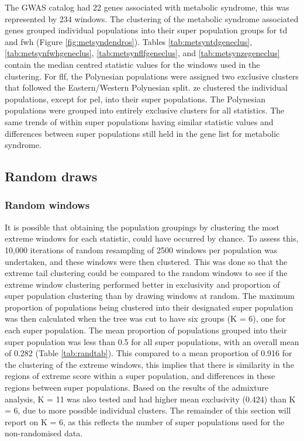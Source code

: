 \documentclass[]{report}
\begin{document}
The GWAS catalog had 22 genes associated with metabolic syndrome, this
was represented by 234 windows. The clustering of the metabolic syndrome
associated genes grouped individual populations into their super
population groups for \gls{td} and \gls{fwh} (Figure
\ref{fig:metsyndendros}). Tables \ref{tab:metsyntdgeneclus},
\ref{tab:metsynfwhgeneclus}, \ref{tab:metsynflfgeneclus}, and
\ref{tab:metsynzegeneclus} contain the median centred statistic values
for the windows used in the clustering. For \gls{flf}, the Polynesian
populations were assigned two exclusive clusters that followed the
Eastern/Western Polynesian split. \Gls{ze} clustered the individual
populations, except for \gls{pel}, into their super populations. The
Polynesian populations were grouped into entirely exclusive clusters for
all statistics. The same trends of within super populations having
similar statistic values and differences between super populations still
held in the gene list for metabolic syndrome.

\subsection{Random draws}\label{random-draws}

\subsubsection{Random windows}\label{random-windows}

It is possible that obtaining the population groupings by clustering the
most extreme windows for each statistic, could have occurred by chance.
To assess this, 10,000 iterations of random resampling of 2500 windows
per population was undertaken, and these windows were then clustered.
This was done so that the extreme tail clustering could be compared to
the random windows to see if the extreme window clustering performed
better in exclusivity and proportion of super population clustering than
by drawing windows at random. The maximum proportion of populations
being clustered into their designated super population was then
calculated when the tree was cut to have six groups (K = 6), one for
each super population. The mean proportion of populations grouped into
their super population was less than 0.5 for all super populations, with
an overall mean of 0.282 (Table \ref{tab:randtab}). This compared to a
mean proportion of 0.916 for the clustering of the extreme windows, this
implies that there is similarity in the regions of extreme score within
a super population, and differences in these regions between super
populations. Based on the results of the admixture analysis, K = 11 was
also tested and had higher mean exclusivity (0.424) than K = 6, due to
more possible individual clusters. The remainder of this section will
report on K = 6, as this reflects the number of super populations used
for the non-randomised data.
\end{document}
